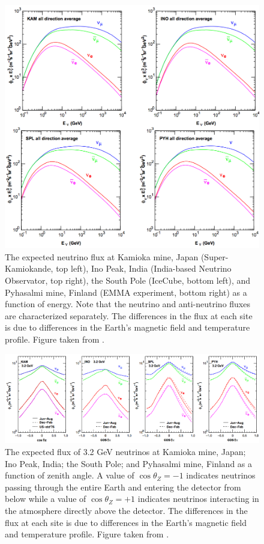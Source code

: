\begin{figure}[!h]
\centering
\includegraphics[width=0.6\linewidth]{honda15_en.png}
\caption{The expected neutrino flux at Kamioka mine, Japan (Super-Kamiokande, top left), Ino Peak, India (India-based Neutrino Observator, top right), the South Pole (IceCube, bottom left), and Pyhasalmi mine, Finland (EMMA experiment, bottom right) as a function of energy. Note that the neutrino and anti-neutrino fluxes are characterized separately. The differences in the flux at each site is due to differences in the Earth's magnetic field and temperature profile. Figure taken from \cite{Honda-2015}.}
\label{fig:honda_en}
\end{figure}

\begin{figure}[!h]
\centering
\includegraphics[width=\linewidth]{honda15_coszen.png}
\caption{The expected flux of 3.2 GeV neutrinos at Kamioka mine, Japan; Ino Peak, India; the South Pole; and Pyhasalmi mine, Finland as a function of zenith angle. A value of $\cos \theta_Z=-1$ indicates neutrinos passing through the entire Earth and entering the detector from below while a value of $\cos \theta_Z=+1$ indicates neutrinos interacting in the atmosphere directly above the detector. The differences in the flux at each site is due to differences in the Earth's magnetic field and temperature profile. Figure taken from \cite{Honda-2015}.}
\label{fig:honda_coszen}
\end{figure}

